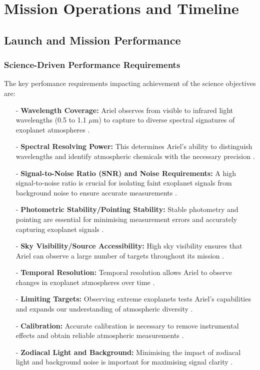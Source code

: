 \documentclass[12pt]{article}
\begin{document}
\newpage

\section{Mission Operations and Timeline}

\subsection{Launch and Mission Performance}

\subsubsection{Science-Driven Performance Requirements}

The key perfomance requirements impacting achievement of the science objectives are:

\begin{itemize}
    \item[-] \textbf{Wavelength Coverage:} Ariel observes from visible to infrared light wavelengths (0.5 to 1.1 $\mu$m) to capture to diverse spectral signatures of exoplanet atmospheres \cite{salvignol2024ariel}.
    \item[-] \textbf{Spectral Resolving Power:} This determines Ariel's ability to distinguish wavelengths and identify atmospheric chemicals with the necessary precision \cite{salvignol2024ariel}.
    \item[-] \textbf{Signal-to-Noise Ratio (SNR) and Noise Requirements:} A high signal-to-noise ratio is crucial for isolating faint exoplanet signals from background noise to ensure accurate measurements \cite{salvignol2024ariel}.
    \item[-] \textbf{Photometric Stability/Pointing Stability:} Stable photometry and pointing are essential for minimising measurement errors and accurately capturing exoplanet signals \cite{salvignol2024ariel}.
    \item[-] \textbf{Sky Visibility/Source Accessibility:} High sky visibility ensures that Ariel can observe a large number of targets throughout its mission \cite{salvignol2024ariel}.
    \item[-] \textbf{Temporal Resolution:} Temporal resolution allows Ariel to observe changes in exoplanet atmospheres over time \cite{salvignol2024ariel}.
    \item[-] \textbf{Limiting Targets:} Observing extreme exoplanets tests Ariel's capabilities and expands our understanding of atmospheric diversity \cite{salvignol2024ariel}.
    \item[-] \textbf{Calibration:} Accurate calibration is necessary to remove instrumental effects and obtain reliable atmospheric measurements \cite{salvignol2024ariel}.
    \item[-] \textbf{Zodiacal Light and Background:} Minimising the impact of zodiacal light and background noise is important for maximising signal clarity \cite{salvignol2024ariel}.
\end{itemize}
\end{document}
